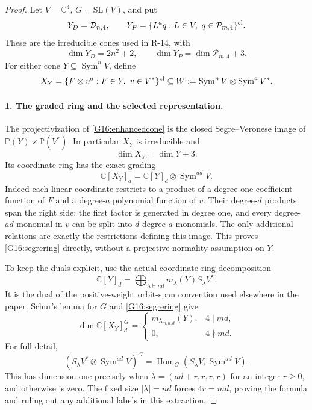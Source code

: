 \documentclass[11pt,a4paper]{article}
\theoremstyle{definition}\newtheorem{definition}{Definition}
\begin{document}
\begin{proof}
Let $V=\mathbb C^4$, $G=\mathrm{SL}(V)$, and put
\[
 Y_D=\mathcal D_{n,4},\qquad
 Y_P=\{L^a q:L\in V,\ q\in\mathcal P_{m,4}\}^{\rm cl}.
\]
These are the irreducible cones used in R-14, with
\[
 \dim Y_D=2n^2+2,\qquad
 \dim Y_P=\dim\mathcal P_{m,4}+3.
\]
For either cone $Y\subseteq\operatorname{Sym}^n V$, define
\begin{equation}\label{G16:enhancedcone}
 X_Y=\{F\otimes v^a:F\in Y,\ v\in V^*\}^{\rm cl}
 \subseteq W:=\operatorname{Sym}^n V\otimes\operatorname{Sym}^a V^*.
\end{equation}

\paragraph{1. The graded ring and the selected representation.}
The projectivization of \eqref{G16:enhancedcone} is the closed
Segre--Veronese image of $\mathbb P(Y)\times\mathbb P(V^*)$.
In particular $X_Y$ is irreducible and
\begin{equation}\label{G16:xdimension}
 \dim X_Y=\dim Y+3.
\end{equation}
Its coordinate ring has the exact grading
\begin{equation}\label{G16:segrering}
 \mathbb C[X_Y]_d=
       \mathbb C[Y]_d\otimes\operatorname{Sym}^{ad}V.
\end{equation}
Indeed each linear coordinate restricts to a product of a degree-one
coefficient function of $F$ and a degree-$a$ polynomial function of $v$.
Their degree-$d$ products span the right side: the first factor is
generated in degree one, and every degree-$ad$ monomial in $v$ can
be split into $d$ degree-$a$ monomials. The only additional relations
are exactly the restrictions defining this image. This proves
\eqref{G16:segrering} directly, without a projective-normality assumption
on $Y$.

To keep the duals explicit, use the actual coordinate-ring decomposition
\[
 \mathbb C[Y]_d=
       \bigoplus_{\lambda\vdash nd}m_\lambda(Y)S_\lambda V^*.
\]
It is the dual of the positive-weight orbit-span convention used
elsewhere in the paper. Schur's lemma for $G$ and
\eqref{G16:segrering} give
\begin{equation}\label{G16:extraction}
 \dim\mathbb C[X_Y]_d^G=
 \begin{cases}
 m_{\lambda_{m,n,d}}(Y),&4\mid md,\\
 0,&4\nmid md.
 \end{cases}
\end{equation}
For full detail,
\[
 (S_\lambda V^*\otimes\operatorname{Sym}^{ad}V)^G
   =\operatorname{Hom}_G(S_\lambda V,\operatorname{Sym}^{ad}V).
\]
This has dimension one precisely when
$\lambda=(ad+r,r,r,r)$ for an integer $r\geq0$, and otherwise is
zero. The fixed size $|\lambda|=nd$ forces $4r=md$, proving
the formula and ruling out any additional labels in this extraction.


\end{proof}
\end{document}

